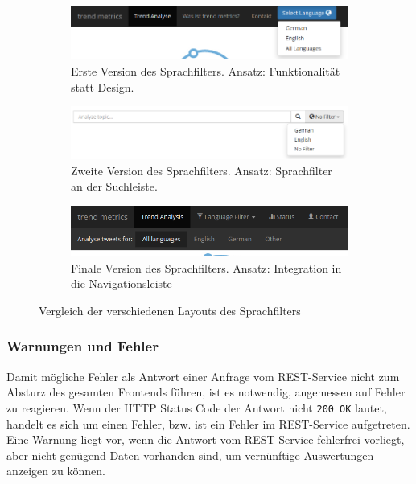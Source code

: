 \begin{figure}[ht]
\centering
\begin{subfigure}[t]{0.8\textwidth}
\includegraphics[width=\textwidth]{Bilder/Frontend/Screenshots/languageFilter1.png}
\caption{Erste Version des Sprachfilters. Ansatz: Funktionalität statt Design.}
\label{fig:langFilter1}
\end{subfigure}
\vspace*{5mm}
\begin{subfigure}[t]{0.8\textwidth}
\includegraphics[width=\textwidth]{Bilder/Frontend/Screenshots/languageFilter2.png}
\caption{Zweite Version des Sprachfilters. Ansatz: Sprachfilter an der Suchleiste.}
\label{fig:langFilter2}
\end{subfigure}
\vspace*{5mm}
\begin{subfigure}[t]{0.8\textwidth}
\includegraphics[width=\textwidth]{Bilder/Frontend/Screenshots/languageFilter3.png}
\caption{Finale Version des Sprachfilters. Ansatz: Integration in die Navigationsleiste}
\label{fig:langFilter3}
\end{subfigure}

\caption{Vergleich der verschiedenen Layouts des Sprachfilters}
\label{fig:langFilter}
\end{figure}

\subsubsection{Warnungen und Fehler}
Damit mögliche Fehler als Antwort einer Anfrage vom REST-Service nicht zum Absturz des gesamten Frontends führen, ist es notwendig, angemessen auf Fehler zu reagieren.
Wenn der HTTP Status Code der Antwort nicht \texttt{200 OK} lautet, handelt es sich um einen Fehler, bzw. ist ein Fehler im REST-Service aufgetreten. Eine Warnung liegt vor, wenn die Antwort vom REST-Service fehlerfrei vorliegt, aber nicht genügend Daten vorhanden sind, um vernünftige Auswertungen anzeigen zu können.

